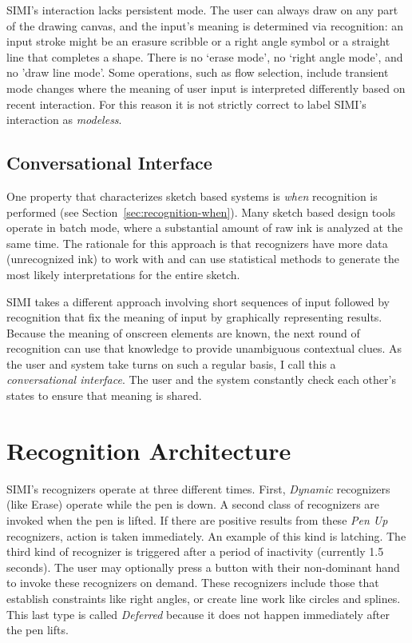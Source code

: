 SIMI's interaction lacks persistent mode. The user can always draw on
any part of the drawing canvas, and the input's meaning is determined
via recognition: an input stroke might be an erasure scribble or a
right angle symbol or a straight line that completes a shape. There is
no `erase mode', no `right angle mode', and no 'draw line mode'. Some
operations, such as flow selection, include transient mode changes
where the meaning of user input is interpreted differently based on
recent interaction. For this reason it is not strictly correct to
label SIMI's interaction as \textit{modeless}.

\subsection{Conversational Interface}

One property that characterizes sketch based systems is \textit{when}
recognition is performed (see
Section~\ref{sec:recognition-when}). Many sketch based design tools
operate in batch mode, where a substantial amount of raw ink is
analyzed at the same time. The rationale for this approach is that
recognizers have more data (unrecognized ink) to work with and can use
statistical methods to generate the most likely interpretations for
the entire sketch.

SIMI takes a different approach involving short sequences of input
followed by recognition that fix the meaning of input by graphically
representing results. Because the meaning of onscreen elements are
known, the next round of recognition can use that knowledge to provide
unambiguous contextual clues. As the user and system take turns on
such a regular basis, I call this a \textit{conversational
  interface}. The user and the system constantly check each other's
states to ensure that meaning is shared.

\section{Recognition Architecture}
\label{sec:recognition-architecture}

SIMI's recognizers operate at three different times. First,
\textit{Dynamic} recognizers (like Erase) operate while the pen is
down. A second class of recognizers are invoked when the pen is
lifted. If there are positive results from these \textit{Pen Up}
recognizers, action is taken immediately. An example of this kind is
latching. The third kind of recognizer is triggered after a period of
inactivity (currently 1.5 seconds). The user may optionally press a
button with their non-dominant hand to invoke these recognizers on
demand. These recognizers include those that establish constraints
like right angles, or create line work like circles and splines. This
last type is called \textit{Deferred} because it does not happen
immediately after the pen lifts.

